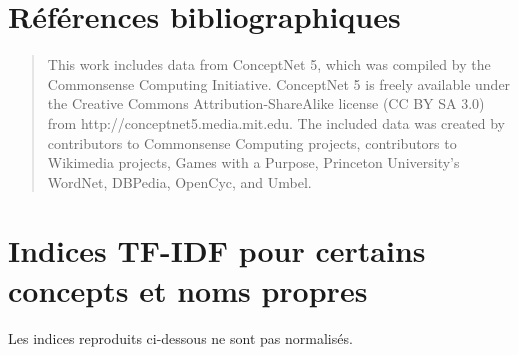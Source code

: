 \documentclass[a4paper, 12pt]{article}
\begin{document}



 

\section{Références bibliographiques}

\begin{quotation}
 This work includes data from ConceptNet 5, which was compiled by the Commonsense Computing Initiative. ConceptNet 5 is freely available under the Creative Commons Attribution-ShareAlike license (CC BY SA 3.0) from http://conceptnet5.media.mit.edu. The included data was created by contributors to Commonsense Computing projects, contributors to Wikimedia projects, Games with a Purpose, Princeton University's WordNet, DBPedia, OpenCyc, and Umbel.
\end{quotation}

\nocite{*}
\printbibliography{}

\newpage
\appendix

\section{Indices TF-IDF pour certains concepts et noms propres}

Les indices reproduits ci-dessous ne sont pas normalisés.
\end{document}
